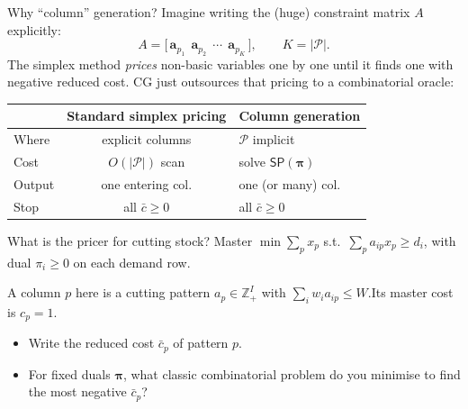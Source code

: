 \documentclass[10pt,aspectratio=169]{beamer}
\newcommand{\Z}{\mathbb{Z}}
\newcommand{\sub}{\mathsf{SP}}
\newcommand{\redcost}{\bar{c}}
\begin{document}
\begin{frame}{Why ``column'' generation?}
  Imagine writing the (huge) constraint matrix $A$ explicitly:
  \[
    A = \big[\, \mathbf a_{p_1}\;\,\mathbf a_{p_2}\;\,\cdots\;\,\mathbf a_{p_K}\,\big],\qquad
    K=|\mathcal P|.
  \]
  The simplex method \emph{prices} non-basic variables one by one until it
  finds one with negative reduced cost. CG just outsources that pricing to a
  combinatorial oracle:
  \begin{center}
  \begin{tabular}{@{}lcl@{}}
    \toprule
    & Standard simplex pricing & Column generation \\
    \midrule
    Where & explicit columns & $\mathcal P$ implicit \\
    Cost & $O(|\mathcal P|)$ scan & solve $\sub(\boldsymbol\pi)$ \\
    Output & one entering col. & one (or many) col. \\
    Stop  & all $\redcost\ge 0$ & all $\redcost\ge 0$ \\
    \bottomrule
  \end{tabular}
  \end{center}
\end{frame}

\begin{frame}{What is the pricer for cutting stock?}
  Master $\min\sum_p x_p$ s.t.\ $\sum_p a_{ip} x_p \ge d_i$, with dual
  $\pi_i\!\ge\!0$ on each demand row.

  \medskip
  \begin{keybox}[Question]
    A column $p$ here is a cutting pattern $a_p\!\in\!\Z_+^I$ with
    $\sum_i w_i a_{ip}\!\le\!W$.\;\;Its master cost is $c_p\!=\!1$.
    \begin{itemize}
      \item Write the reduced cost $\redcost_p$ of pattern $p$.
      \item For fixed duals $\boldsymbol\pi$, what classic combinatorial
            problem do you minimise to find the most negative $\redcost_p$?
    \end{itemize}
  \end{keybox}
\end{frame}
\end{document}
